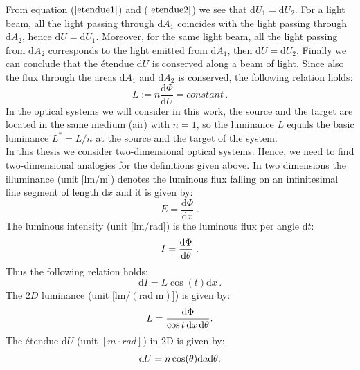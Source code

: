 From equation ($\ref{etendue1}$) and ($\ref{etendue2}$) we see that $\textrm{d}U_1=\textrm{d}U_2$.
For a light beam, all the light passing through $\textrm{d}A_1$ coincides with the light passing through $\textrm{d}A_2$, hence $\textrm{d}U = \textrm{d}U_1$. Moreover, for the same light beam, all the light passing from $\textrm{d}A_2$ corresponds to the light emitted from $\textrm{d}A_1$, then $\textrm{d}U=\textrm{d}U_2$. Finally we can conclude that the \'{e}tendue $\textrm{d}U$ is conserved along a beam of light. Since also the flux through the areas $\textrm{d}A_1$ and $\textrm{d}A_2$ is conserved, the following relation holds:
\begin{equation}\label{basicluminance}
L := n \frac{\textrm{d}\Phi}{\textrm{d}U} = constant\,.
\end{equation}
 In the optical systems we will consider in this work, the source and the target are located in the same medium (air) with $n=1$, so the luminance $L$ equals the basic luminance $L^* = L/n$ at the source and the target of the system.\\
\indent In this thesis we consider two-dimensional optical systems. 
 Hence, we need to find two-dimensional analogies for the definitions given above.
In two dimensions the illuminance \big(unit $\big[\textrm{lm}/\textrm{m}\big]$\big) denotes the luminous flux falling on an infinitesimal line segment of length $\textrm{d}x$ and it is given by:
 \begin{equation}
 E=\frac{\textrm{d}\Phi}{\textrm{d}x}\;.
 \end{equation}
 The luminous intensity \big(unit $\big[\textrm{lm}/\textrm{rad}\big]$\big) is the luminous flux per angle $\textrm{d}t$:
 \begin{equation}
 I=\frac{\textrm{d}\Phi}{\textrm{d}\mbox{$\theta$}}\;.
 \end{equation}
 Thus the following relation holds:
 \begin{equation}
 \textrm{d}I = L\cos(t)\textrm{d}x\,.
 \end{equation}
 The $2D$ luminance \big(unit $\big[\textrm{lm}/(\textrm{rad}\; \textrm{m})\big]$\big) is given by:
 \begin{equation}
 L = \frac{\textrm {d}\Phi}{\cos t\,\textrm{d}x \,\textrm{d}\mbox{$\theta$}}.
 \end{equation}
  The \'{e}tendue $\textrm{d}U $ (unit $[m\cdot rad]$) in $2$D is given by:
\begin{equation}\label{etendue2d}
\textrm{d}U = n\cos(\mbox{$\theta$}) \textrm{d}a\textrm{d}\mbox{$\theta$}.
\end{equation}



